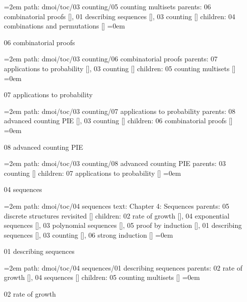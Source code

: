 \par\begingroup
\leftskip=2em
path: dmoi/toc/03 counting/05 counting multisets
\smallskip
parents:  06 combinatorial proofs [], 01 describing sequences [], 03 counting []
\smallskip
children: 04 combinations and permutations []
\smallskip
\leftskip=0em
\par\endgroup
\bigskip
{}
06 combinatorial proofs
\smallskip
\par\begingroup
\leftskip=2em
path: dmoi/toc/03 counting/06 combinatorial proofs
\smallskip
parents:  07 applications to probability [], 03 counting []
\smallskip
children: 05 counting multisets []
\smallskip
\leftskip=0em
\par\endgroup
\bigskip
{}
07 applications to probability
\smallskip
\par\begingroup
\leftskip=2em
path: dmoi/toc/03 counting/07 applications to probability
\smallskip
parents:  08 advanced counting PIE [], 03 counting []
\smallskip
children: 06 combinatorial proofs []
\smallskip
\leftskip=0em
\par\endgroup
\bigskip
{}
08 advanced counting PIE
\smallskip
\par\begingroup
\leftskip=2em
path: dmoi/toc/03 counting/08 advanced counting PIE
\smallskip
parents:  03 counting []
\smallskip
children: 07 applications to probability []
\smallskip
\leftskip=0em
\par\endgroup
\bigskip
{}
04 sequences
\smallskip
\par\begingroup
\leftskip=2em
path: dmoi/toc/04 sequences
\smallskip
text:  Chapter 4: Sequences
\smallskip
parents:  05 discrete structures revisited []
\smallskip
children: 02 rate of growth [], 04 exponential sequences [], 03 polynomial sequences [], 05 proof by induction [], 01 describing sequences [], 03 counting [], 06 strong induction []
\smallskip
\leftskip=0em
\par\endgroup
\bigskip
{}
01 describing sequences
\smallskip
\par\begingroup
\leftskip=2em
path: dmoi/toc/04 sequences/01 describing sequences
\smallskip
parents:  02 rate of growth [], 04 sequences []
\smallskip
children: 05 counting multisets []
\smallskip
\leftskip=0em
\par\endgroup
\bigskip
{}
02 rate of growth
\smallskip
